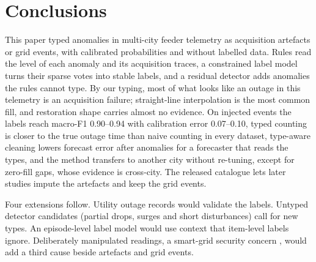 \section{Conclusions}\label{sec:conclusions}

This paper typed anomalies in multi-city feeder telemetry as acquisition artefacts or grid events, with calibrated probabilities and without labelled data. Rules read the level of each anomaly and its acquisition traces, a constrained label model turns their sparse votes into stable labels, and a residual detector adds anomalies the rules cannot type. By our typing, most of what looks like an outage in this telemetry is an acquisition failure; straight-line interpolation is the most common fill, and restoration shape carries almost no evidence. On injected events the labels reach macro-F1 0.90--0.94 with calibration error 0.07--0.10, typed counting is closer to the true outage time than naive counting in every dataset, type-aware cleaning lowers forecast error after anomalies for a forecaster that reads the types, and the method transfers to another city without re-tuning, except for zero-fill gaps, whose evidence is cross-city. The released catalogue lets later studies impute the artefacts and keep the grid events.

Four extensions follow. Utility outage records would validate the labels. Untyped detector candidates (partial drops, surges and short disturbances) call for new types. An episode-level label model would use context that item-level labels ignore. Deliberately manipulated readings, a smart-grid security concern \cite{hassine2025security}, would add a third cause beside artefacts and grid events.
